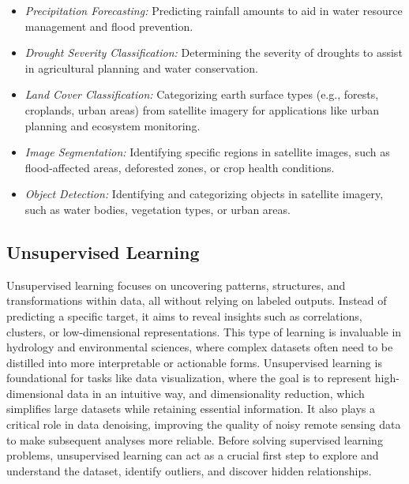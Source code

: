 \begin{itemize}
    \item \textit{Precipitation Forecasting:} Predicting rainfall amounts to aid in water resource management and flood prevention.
\item \textit{Drought Severity Classification:} Determining the severity of droughts to assist in agricultural planning and water conservation.
\item \textit{Land Cover Classification:} Categorizing earth surface types (e.g., forests, croplands, urban areas) from satellite imagery for applications like urban planning and ecosystem monitoring.
\item \textit{Image Segmentation:} Identifying specific regions in satellite images, such as flood-affected areas, deforested zones, or crop health conditions.
\item \textit{Object Detection:} Identifying and categorizing objects in satellite imagery, such as water bodies, vegetation types, or urban areas.
\end{itemize}


\subsection{Unsupervised Learning }

Unsupervised learning focuses on uncovering patterns, structures, and transformations within data, all without relying on labeled outputs. Instead of predicting a specific target, it aims to reveal insights such as correlations, clusters, or low-dimensional representations. This type of learning is invaluable in hydrology and environmental sciences, where complex datasets often need to be distilled into more interpretable or actionable forms. 
Unsupervised learning is foundational for tasks like data visualization, where the goal is to represent high-dimensional data in an intuitive way, and dimensionality reduction, which simplifies large datasets while retaining essential information. It also plays a critical role in data denoising, improving the quality of noisy remote sensing data to make subsequent analyses more reliable. Before solving supervised learning problems, unsupervised learning can act as a crucial first step to explore and understand the dataset, identify outliers, and discover hidden relationships.

